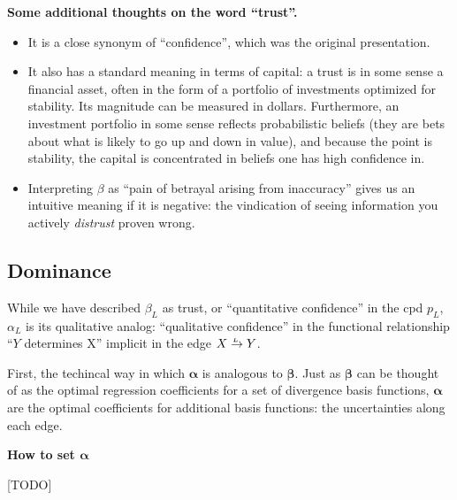 \documentclass[twoside]{article} %
\theoremstyle{plain}
\theoremstyle{definition}
\newcommand{\balpha}{\boldsymbol\alpha}
\newcommand{\bbeta}{\boldsymbol\beta}
\newcommand{\ed}[3]{#2%
    	  \overset{\smash{\mskip-5mu\raisebox{-1pt}{$\scriptscriptstyle
    	        #1$}}}{\rightarrow} #3}
\begin{document}
    
    \textbf{Some additional thoughts on the word ``trust''.}
    \begin{itemize}
        \item It is a close synonym of ``confidence'', which was the original presentation.

        \item It also has a standard meaning in terms of capital: a trust is in some sense a financial asset, often in the form of a portfolio of investments optimized for stability. Its magnitude can be measured in dollars.
        Furthermore, an investment portfolio in some sense reflects probabilistic beliefs (they are bets about what is likely to go up and down in value), and because the point is stability, the capital is concentrated in beliefs one has high confidence in.

        \item Interpreting $\beta$ as ``pain of betrayal arising from inaccuracy'' gives us an intuitive meaning if it is negative: the vindication of seeing information you actively \emph{distrust} proven wrong.
    \end{itemize}





    \subsection{Dominance}
    While we have described $\beta_L$ as trust, or ``quantitative confidence'' in the cpd $p_L$,
    $\alpha_L$ is its qualitative analog: ``qualitative confidence'' in the functional relationship ``$Y$ determines X'' implicit in the edge $\ed LXY$.
        
    First, the techincal way in which $\balpha$ is analogous to $\bbeta$. 
    Just as $\bbeta$ can be thought of as the optimal regression coefficients for a set of divergence basis functions, $\balpha$ are the optimal coefficients for additional basis functions: the uncertainties along each edge.
    
    
    \textbf{How to set $\balpha$}

    [TODO]
    
    \begin{center}
    \end{center}
\end{document}
